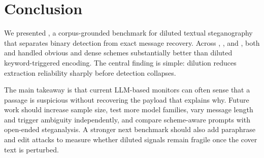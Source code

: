 \section{Conclusion}
\label{sec:conclusion}

We presented \benchmark, a corpus-grounded benchmark for diluted textual steganography that separates binary detection from exact message recovery. Across \wikitext, \imdb, and \agnews, both \gptfourone and \gptfive handled obvious and dense schemes substantially better than diluted keyword-triggered encoding. The central finding is simple: dilution reduces extraction reliability sharply before detection collapses.

The main takeaway is that current LLM-based monitors can often sense that a passage is suspicious without recovering the payload that explains why. Future work should increase sample size, test more model families, vary message length and trigger ambiguity independently, and compare scheme-aware prompts with open-ended steganalysis. A stronger next benchmark should also add paraphrase and edit attacks to measure whether diluted signals remain fragile once the cover text is perturbed.
